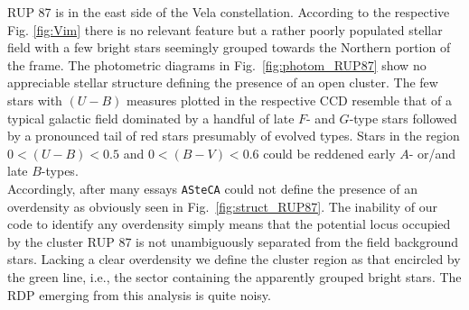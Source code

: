 \documentclass[draft]{aa}
\begin{document}
RUP 87 is in the east side of the Vela constellation. According to the
respective Fig. \ref{fig:Vim} there is no relevant feature but a rather
poorly populated stellar field with a few bright stars
seemingly grouped  towards the Northern portion of the frame.
The photometric diagrams in Fig.~\ref{fig:photom_RUP87} show no appreciable
stellar structure defining the presence of an open cluster.
The few stars with $(U-B)$ measures plotted in the respective CCD
resemble that of a typical galactic field dominated by a handful of late $F$-
and $G$-type stars followed by a pronounced tail of red stars presumably of
evolved types. Stars in the region $0<(U-B)<0.5$ and $0<(B-V)<0.6$ could be
reddened early $A$- or/and late $B$-types.\\

Accordingly, after many essays \texttt{ASteCA} could not define the presence of
an overdensity as obviously seen in Fig.~\ref{fig:struct_RUP87}.
The inability of our code to identify any overdensity simply means that the
potential locus occupied by the cluster RUP 87 is not unambiguously separated
from the field background stars.
Lacking a clear overdensity we define the
cluster region as that encircled by the green line, i.e., the
sector containing the apparently grouped bright stars. The RDP emerging from
this analysis is quite noisy.
\end{document}
